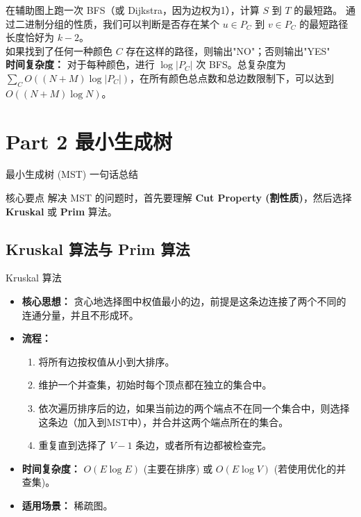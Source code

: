 \documentclass[11pt]{beamer}
\begin{document}
\begin{frame}
    在辅助图上跑一次 BFS（或 Dijkstra，因为边权为1），计算 $S$ 到 $T$ 的最短路。
    通过二进制分组的性质，我们可以判断是否存在某个 $u \in P_C$ 到 $v \in P_C$ 的最短路径长度恰好为 $k-2$。\\
    如果找到了任何一种颜色 $C$ 存在这样的路径，则输出"NO"；否则输出"YES"\\
    \textbf{时间复杂度：} 对于每种颜色，进行 $\log |P_C|$ 次 BFS。总复杂度为 $\sum_{C} O((N+M) \log |P_C|)$，在所有颜色总点数和总边数限制下，可以达到 $O((N+M) \log N)$。
\end{frame}

\section{Part 2 最小生成树}
\begin{frame}{最小生成树 (MST) 一句话总结}
    \begin{block}{核心要点}
        解决 MST 的问题时，首先要理解 \textbf{Cut Property (割性质)}，然后选择 \textbf{Kruskal} 或 \textbf{Prim} 算法。
    \end{block}
\end{frame}

\subsection{Kruskal 算法与 Prim 算法}
\begin{frame}{Kruskal 算法}
    \begin{itemize}
        \item \textbf{核心思想：} 贪心地选择图中权值最小的边，前提是这条边连接了两个不同的连通分量，并且不形成环。
        \item \textbf{流程：}
        \begin{enumerate}
            \item 将所有边按权值从小到大排序。
            \item 维护一个并查集，初始时每个顶点都在独立的集合中。
            \item 依次遍历排序后的边，如果当前边的两个端点不在同一个集合中，则选择这条边（加入到MST中），并合并这两个端点所在的集合。
            \item 重复直到选择了 $V-1$ 条边，或者所有边都被检查完。
        \end{enumerate}
        \item \textbf{时间复杂度：} $O(E \log E)$ (主要在排序) 或 $O(E \log V)$ (若使用优化的并查集)。
        \item \textbf{适用场景：} 稀疏图。
    \end{itemize}
\end{frame}
\end{document}
